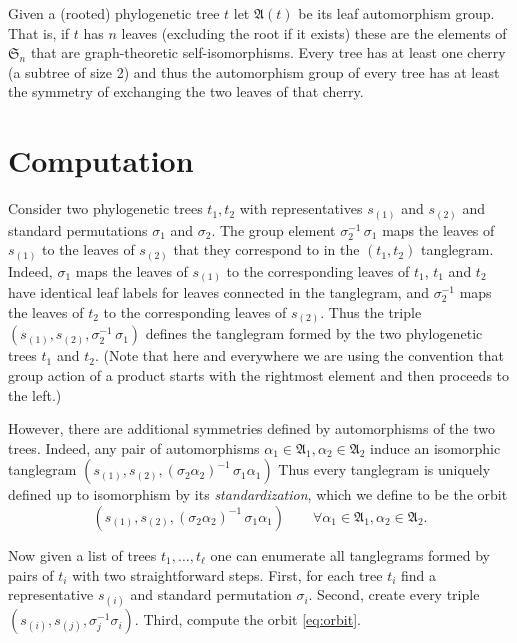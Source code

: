 \documentclass{amsart}
\newcommand{\fS}{\mathfrak S}
\newcommand{\fA}{\mathfrak A}
\begin{document}
Given a (rooted) phylogenetic tree $t$ let $\fA(t)$ be its leaf automorphism group.
That is, if $t$ has $n$ leaves (excluding the root if it exists) these are the elements of $\fS_n$ that are graph-theoretic self-isomorphisms.
Every tree has at least one cherry (a subtree of size 2) and thus the automorphism group of every tree has at least the symmetry of exchanging the two leaves of that cherry.


\section{Computation}
Consider two phylogenetic trees $t_1, t_2$ with representatives $s_{(1)}$ and $s_{(2)}$ and standard permutations $\sigma_1$ and $\sigma_2$.
The group element $\sigma_2^{-1} \, \sigma_1$ maps the leaves of $s_{(1)}$ to the leaves of $s_{(2)}$ that they correspond to in the $(t_1, t_2)$ tanglegram.
Indeed, $\sigma_1$ maps the leaves of $s_{(1)}$ to the corresponding leaves of $t_1$, $t_1$ and $t_2$ have identical leaf labels for leaves connected in the tanglegram, and $\sigma_2^{-1}$ maps the leaves of $t_2$ to the corresponding leaves of $s_{(2)}$.
Thus the triple $(s_{(1)}, s_{(2)}, \sigma_2^{-1} \, \sigma_1)$ defines the tanglegram formed by the two phylogenetic trees $t_1$ and $t_2$.
(Note that here and everywhere we are using the convention that group action of a product starts with the rightmost element and then proceeds to the left.)

However, there are additional symmetries defined by automorphisms of the two trees.
Indeed, any pair of automorphisms $\alpha_1 \in \fA_1, \alpha_2 \in \fA_2$ induce an isomorphic tanglegram $(s_{(1)}, s_{(2)}, \left(\sigma_2 \alpha_2 \right)^{-1} \, \sigma_1 \alpha_1)$
Thus every tanglegram is uniquely defined up to isomorphism by its \textit{standardization}, which we define to be the orbit
\begin{equation}
\label{eq:orbit}
(s_{(1)}, s_{(2)}, \left(\sigma_2 \alpha_2 \right)^{-1} \, \sigma_1 \alpha_1) \qquad \forall \alpha_1 \in \fA_1, \alpha_2 \in \fA_2.
\end{equation}

Now given a list of trees $t_1, \ldots, t_\ell$ one can enumerate all tanglegrams formed by pairs of $t_i$ with two straightforward steps.
First, for each tree $t_i$ find a representative $s_{(i)}$ and standard permutation $\sigma_i$.
Second, create every triple $(s_{(i)}, s_{(j)}, \sigma_j^{-1} \sigma_i)$.
Third, compute the orbit \eqref{eq:orbit}.
\end{document}

